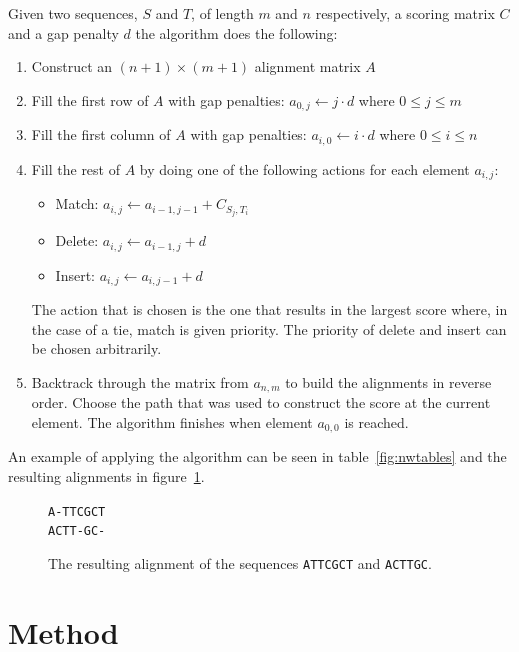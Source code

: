 \documentclass[a4paper]{report}
\begin{document}
Given two sequences, $S$ and $T$, of length $m$ and $n$ respectively, a scoring
matrix $C$ and a gap penalty $d$ the algorithm does the following:

\begin{enumerate}
    \item Construct an $(n + 1) \times (m + 1)$ alignment matrix $A$
    \item Fill the first row of $A$ with gap penalties: $a_{0,j} \gets j \cdot
        d$ where $0 \le j \le m$
    \item Fill the first column of $A$ with gap penalties: $a_{i,0} \gets i
        \cdot d$ where $0 \le i \le n$
    \item Fill the rest of $A$ by doing one of the following actions for each
        element $a_{i,j}$:
        \begin{itemize}
            \item Match: $a_{i,j} \gets a_{i - 1, j - 1} + C_{S_j,T_i}$
            \item Delete: $a_{i,j} \gets a_{i - 1, j} + d$
            \item Insert: $a_{i,j} \gets a_{i, j - 1} + d$
        \end{itemize}
        The action that is chosen is the one that results in the largest score
        where, in the case of a tie, match is given priority. The priority of
        delete and insert can be chosen arbitrarily.
    \item Backtrack through the matrix from $a_{n,m}$ to build the alignments
        in reverse order. Choose the path that was used to construct the score
        at the current element. The algorithm finishes when element $a_{0,0}$
        is reached.
\end{enumerate}

An example of applying the algorithm can be seen in table~\ref{fig:nwtables}
and the resulting alignments in figure~\ref{fig:align}.

\begin{figure}[h]
    \centering
    \texttt{A-TTCGCT\\ACTT-GC-}
    \captionsetup{width=0.8\textwidth}
    \caption{The resulting alignment of the sequences \texttt{ATTCGCT} and
    \texttt{ACTTGC}.}
    \label{fig:align}
\end{figure}

\chapter{Method}
\end{document}
